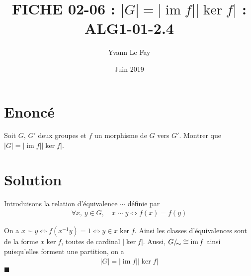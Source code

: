 \documentclass{article}
\newcommand*{\QED}{\hfill\ensuremath{\blacksquare}}%
\DeclareMathOperator{\im}{im}
\begin{document}
\title{FICHE 02-06 : $|G|=|\im f||\ker f|$ : ALG1-01-2.4}
\author{Yvann Le Fay}
\date{Juin 2019}
\maketitle
\section*{Enoncé}
Soit $G,\, G'$ deux groupes et $f$ un morphisme de $G$ vers $G'$. Montrer que $|G|=|\im f||\ker f|$.
\section*{Solution}
Introduisons la relation d'équivalence $\sim$ définie par 
\begin{align*}
\forall x,\, y\in G,\quad x\sim y \Longleftrightarrow f(x) = f(y)
\end{align*}

On a $x\sim y \Longleftrightarrow f(x^{-1}y) = 1 \Longleftrightarrow y\in x\ker f$. Ainsi les classes d'équivalences sont de la forme $x\ker f$, toutes de cardinal $|\ker f|$. Aussi, $G/\!\raisebox{-.50ex}{\ensuremath{\sim}} \cong \im f$ ainsi puisqu'elles forment une partition, on a
\begin{align*}
|G|=|\im f||\ker f|
\end{align*}
\QED
\end{document}
